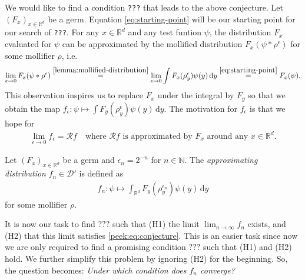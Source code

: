 We would like to find a condition \texttt{???} that leads to the above conjecture. Let $(F_x)_{x \in \mathbb{R}^d}$ be a germ. Equation \eqref{eq:starting-point} will be our starting point for our search of \texttt{???}. For any $x \in \mathbb{R}^d$ and any test funtion $\psi$, the distribution $F_x$ evaluated for $\psi$ can be approximated by the mollified distribution $F_x(\psi * \rho^\epsilon)$ for some mollifier $\rho$, i.e.
\begin{align*}
    \lim_{\epsilon \to 0}F_x(\psi * \rho^\epsilon) \overset{\eqref{lemma:mollified-distribution}}{=} \lim_{\epsilon \to 0} \int F_x(\rho_y^\epsilon) \psi(y)\, \mathrm{d}y \overset{\eqref{eq:starting-point}}{=} F_x(\psi).
\end{align*}
This observation inspires us to replace $F_x$ under the integral by $F_y$ so that we obtain the map $f_\epsilon: \psi \mapsto \int F_y(\rho_y^\epsilon) \psi(y)\, \mathrm{d}y$. The motivation for $f_\epsilon$ is that we hope for 
\begin{align*}
    \lim_{\epsilon \to 0}f_\epsilon = \mathcal{R}f \quad \text{where } \mathcal{R}f \text{ is approximated by $F_x$ around any $x \in \mathbb{R}^d$}.
\end{align*}
\begin{definition}\label{def:approximating-distributions}
        Let $(F_x)_{x \in \mathbb{R}^d}$ be a germ and $\epsilon_n = 2^{-n}$ for $n \in \mathbb{N}$. The \emph{approximating distribution} $f_n \in \mathcal{D}'$ is defined as 
        \begin{align*}
                f_n: \psi \mapsto \int_{\mathbb{R}^d} F_y(\rho_y^{\epsilon_n}) \psi(y)\, \mathrm{d}y
        \end{align*}
        for some mollifier $\rho$. 
\end{definition}
It is now our task to find $\texttt{???}$ such that (H1) the limit $\lim_{n \to \infty}f_n$ exists, and (H2) that this limit satisfies \eqref{peek:eq:conjecture}. This is an easier task since now we are only required to find a promising condition $\texttt{???}$ such that (H1) and (H2) hold. We further simplify this problem by ignoring (H2) for the beginning. So, the question becomes: \emph{Under which condition does $f_n$ converge?}

